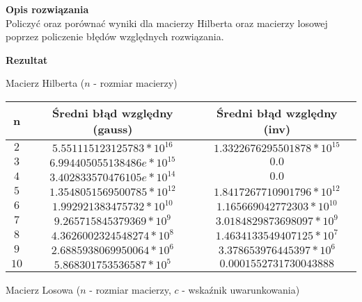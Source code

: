\documentclass{article}
\begin{document}
\noindent \textbf{Opis rozwiązania} \\
Policzyć oraz porównać wyniki dla macierzy Hilberta oraz macierzy losowej poprzez
policzenie błędów względnych rozwiązania.

\noindent \textbf{Rezultat}

\noindent Macierz Hilberta ($n$ - rozmiar macierzy)

\begin{center}
	\begin{tabular}{|c|c|c|}
		\hline
		\textbf{n} & \textbf{Średni błąd względny (gauss)} & \textbf{Średni błąd względny (inv)} \\
		\hline
		$2$        & $5.551115123125783*10^{16}$           & $1.3322676295501878*10^{15}$        \\
		\hline
		$3$        & $6.994405055138486e*10^{15}$          & $0.0$                               \\
		\hline
		$4$        & $3.402833570476105e*10^{14}$          & $0.0 $                              \\
		\hline
		$5$        & $1.3548051569500785*10^{12}$          & $1.8417267710901796*10^{12}$        \\
		\hline
		$6$        & $1.992921383475732*10^{10}$           & $1.165669042772303*10^{10}$         \\
		\hline
		$7$        & $9.265715845379369*10^{9}$            & $3.0184829873698097*10^{9}$         \\
		\hline
		$8$        & $4.3626002324548274*10^{8}$           & $1.4634133549407125*10^{7}$         \\
		\hline
		$9$        & $2.6885938069950064*10^{6}$           & $3.378653976445397*10^{6}$          \\
		\hline
		$10$       & $5.868301753536587*10^{5}$            & $0.0001552731730043888$             \\
		\hline
	\end{tabular}
\end{center}

\noindent Macierz Losowa ($n$ - rozmiar macierzy, $c$ - wskaźnik uwarunkowania)
\end{document}
